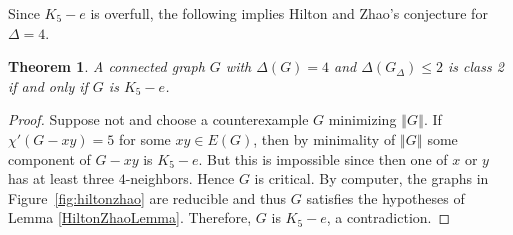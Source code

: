 \documentclass[12pt]{article}
\theoremstyle{plain}
\newtheorem{thm}{Theorem}[section]
\theoremstyle{definition}
\theoremstyle{remark}
\newcommand{\size}[1]{\left\Vert#1\right\Vert}
\begin{document}
Since $K_5 - e$ is overfull, the following implies Hilton and Zhao's conjecture for $\Delta=4$.
\begin{thm}
A connected graph $G$ with $\Delta(G) = 4$ and $\Delta(G_\Delta) \le 2$ is class 2 if and only if $G$ is $K_5-e$.
\end{thm}
\begin{proof}
Suppose not and choose a counterexample $G$ minimizing $\size{G}$.  If $\chi'(G-xy) = 5$ for some $xy \in E(G)$, then by minimality of $\size{G}$ some component of $G-xy$ is $K_5-e$.  But this is impossible since then one of $x$ or $y$ has at least three $4$-neighbors.  Hence $G$ is critical. By computer, the graphs in Figure~\ref{fig:hiltonzhao} are reducible and thus $G$ satisfies the hypotheses of Lemma \ref{HiltonZhaoLemma}.  Therefore, $G$ is $K_5-e$, a contradiction.
\end{proof}
\end{document}
